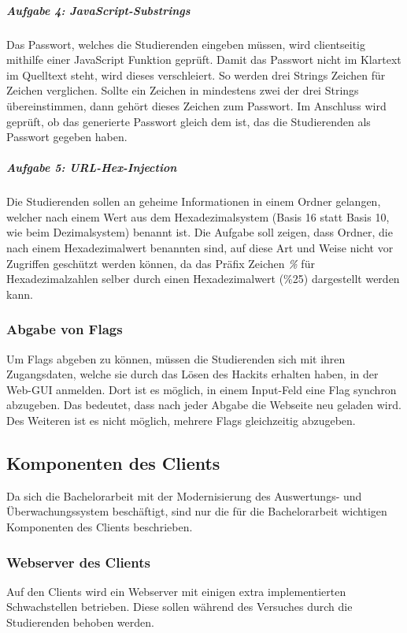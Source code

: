 \subparagraph{Aufgabe 4: JavaScript-Substrings}\label{subpara:Aufgabe_4_JavaScript-Substrings}
Das Passwort, welches die Studierenden eingeben müssen, wird clientseitig mithilfe einer JavaScript Funktion geprüft. Damit das Passwort nicht im Klartext im Quelltext steht, wird dieses verschleiert. So werden drei Strings Zeichen für Zeichen verglichen. Sollte ein Zeichen in mindestens zwei der drei Strings übereinstimmen, dann gehört dieses Zeichen zum Passwort. Im Anschluss wird geprüft, ob das generierte Passwort gleich dem ist, das die Studierenden als Passwort gegeben haben.

\subparagraph{Aufgabe 5: URL-Hex-Injection}\label{subpara:Aufgabe_5_URL-Hex-Injection}
Die Studierenden sollen an geheime Informationen in einem Ordner gelangen, welcher nach einem Wert aus dem Hexadezimalsystem (Basis 16 statt Basis 10, wie beim Dezimalsystem) benannt ist. Die Aufgabe soll zeigen, dass Ordner, die nach einem Hexadezimalwert benannten sind, auf diese Art und Weise nicht vor Zugriffen geschützt werden können, da das Präfix Zeichen \textit{\%} für Hexadezimalzahlen selber durch einen Hexadezimalwert (\%25) dargestellt werden kann.

\subsubsection{Abgabe von Flags}\label{subsubsec:Abgabe_von_Flags}
Um Flags abgeben zu können, müssen die Studierenden sich mit ihren Zugangsdaten, welche sie durch das Lösen des Hackits erhalten haben, in der Web-GUI anmelden. Dort ist es möglich, in einem Input-Feld eine Flag synchron abzugeben. Das bedeutet, dass nach jeder Abgabe die Webseite neu geladen wird. Des Weiteren ist es nicht möglich, mehrere Flags gleichzeitig abzugeben.

\subsection{Komponenten des Clients}\label{subsec:Komponente_des_Clients}
Da sich die Bachelorarbeit mit der Modernisierung des Auswertungs- und Überwachungssystem beschäftigt, sind nur die für die Bachelorarbeit wichtigen Komponenten des Clients beschrieben.

\subsubsection{Webserver des Clients}\label{subsubsec:Webserver_des_Clients}
Auf den Clients wird ein Webserver mit einigen extra implementierten Schwachstellen betrieben. Diese sollen während des Versuches durch die Studierenden behoben werden.


